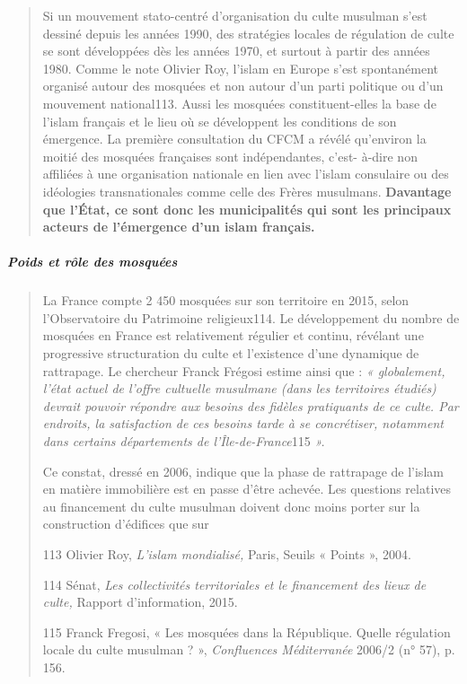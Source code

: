 \begin{quote}
Si un mouvement stato-centré d'organisation du culte musulman s'est
dessiné depuis les années 1990, des stratégies locales de régulation de
culte se sont développées dès les années 1970, et surtout à partir des
années 1980. Comme le note Olivier Roy, l'islam en Europe s'est
spontanément organisé autour des mosquées et non autour d'un parti
politique ou d'un mouvement national113. Aussi les mosquées
constituent-elles la base de l'islam français et le lieu où se
développent les conditions de son émergence. La première consultation du
CFCM a révélé qu'environ la moitié des mosquées françaises sont
indépendantes, c'est- à-dire non affiliées à une organisation nationale
en lien avec l'islam consulaire ou des idéologies transnationales comme
celle des Frères musulmans. \textbf{Davantage que l'État, ce sont donc
les municipalités qui sont les principaux acteurs de l'émergence d'un
islam français.}
\end{quote}

\hypertarget{poids-et-ruxf4le-des-mosquuxe9es}{%
\subparagraph{Poids et rôle des
mosquées}\label{poids-et-ruxf4le-des-mosquuxe9es}}

\begin{quote}
La France compte 2 450 mosquées sur son territoire en 2015, selon
l'Observatoire du Patrimoine religieux114. Le développement du nombre de
mosquées en France est relativement régulier et continu, révélant une
progressive structuration du culte et l'existence d'une dynamique de
rattrapage. Le chercheur Franck Frégosi estime ainsi que : \emph{«
globalement, l'état actuel de l'offre cultuelle musulmane (dans les
territoires étudiés) devrait pouvoir répondre aux besoins des fidèles
pratiquants de ce culte. Par endroits, la satisfaction de ces besoins
tarde à se concrétiser, notamment dans certains départements de
l'Île-de-France}115 \emph{».}

Ce constat, dressé en 2006, indique que la phase de rattrapage de
l'islam en matière immobilière est en passe d'être achevée. Les
questions relatives au financement du culte musulman doivent donc moins
porter sur la construction d'édifices que sur

113 Olivier Roy, \emph{L'islam mondialisé,} Paris, Seuils « Points »,
2004.

114 Sénat, \emph{Les collectivités territoriales et le financement des
lieux de culte,} Rapport d'information, 2015.

115 Franck Fregosi, « Les mosquées dans la République. Quelle régulation
locale du culte musulman ? », \emph{Confluences Méditerranée} 2006/2 (n°
57), p. 156.
\end{quote}

